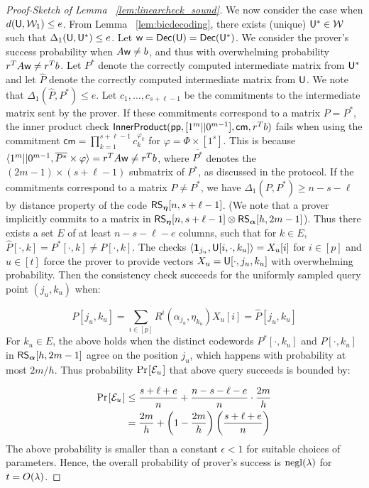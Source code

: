 \begin{proof}[Proof-Sketch of Lemma ~\ref{lem:linearcheck_sound}]
We now consider the case when $d(\mathsf{U},\mathcal{W}_1)\leq e$. From Lemma
~\ref{lem:bicdecoding}, there exists (unique) $\mathsf{U}^*\in \mathcal{W}$
such that $\Delta_1(\mathsf{U},\mathsf{U}^*)\leq e$.
Let $\mathsf{w}=\mathsf{Dec}(\mathsf{U})=\mathsf{Dec}(\mathsf{U}^*)$. We consider the prover's success
probability when $A\mathsf{w}\neq b$, and thus with overwhelming probability $r^TA \mathsf{w} \neq
r^Tb$. Let $P^*$ denote the correctly computed intermediate matrix from $\mathsf{U}^*$ and let
$\hat{P}$ denote the correctly computed intermediate matrix from $\mathsf{U}$. We note that
$\Delta_1(\hat{P},P^*)\leq e$. Let $c_1,\ldots,c_{s+\ell-1}$ be the commitments
to the intermediate matrix sent by the prover. If these commitments correspond to a
matrix $P=P^*$, the inner product check
$\mathsf{InnerProduct}(\mathsf{pp},[1^m||0^{m-1}],\mathsf{cm},r^Tb)$ fails when using the
commitment $\mathsf{cm}=\prod_{k=1}^{s+\ell-1}c_k^{\varphi_k}$ for
$\varphi=\Phi\times [1^s]$. This is because $\langle 1^m||0^{m-1},\overline{P^*}\times
\varphi\rangle=r^TA\mathsf{w}\neq r^Tb$, where $\overline{P^*}$ denotes the
$(2m-1)\times (s+\ell-1)$ submatrix of $P^*$,
as discussed in the protocol. If the
commitments correspond  to a matrix $P\neq P^*$, we have
$\Delta_1(P,P^*)\geq n-s-\ell$ by distance property of the code
$\mathsf{RS}_{\bm{\eta}}[n, s+\ell-1]$. 
(We note that a prover implicitly commits to a matrix in
$\mathsf{RS}_{\bm{\eta}}[n,s+\ell-1]\otimes \mathsf{RS}_{\bm{\alpha}}[h,2m-1]$).
Thus there exists a set $E$ of at least $n-s-\ell-e$ columns, such that for
$k\in E$, $\hat{P}[\cdot,k]=P^*[\cdot,k]\neq P[\cdot,k]$. The checks
$\langle \bm{1}_{j_u},\mathsf{U}[i,\cdot,k_u]\rangle=X_u[i]$ for $i\in [p]$ and $u\in [t]$ 
force the prover to provide vectors $X_u=\mathsf{U}[\cdot,j_u,k_u]$ with
overwhelming probability. Then the consistency check succeeds for the 
uniformly sampled query point $(j_u,k_u)$ when:

{\footnotesize
\[ P[j_u,k_u] = \sum_{i\in [p]}R^i(\alpha_{j_u},\eta_{k_u})X_u[i] =
\hat{P}[j_u,k_u] \]}
For $k_u\in E$, the above holds when the distinct codewords $P^*[\cdot,k_u]$ and
$P[\cdot,k_u]$ in $\mathsf{RS}_{\bm{\alpha}}[h,2m-1]$ agree on the position $j_u$, which happens with 
probability at most $2m/h$. Thus probability $\prob{\mc{E}_u}$ that above query succeeds is bounded by:

{\footnotesize
\begin{align*}
\prob{\mc{E}_u}&\leq \frac{s+\ell+e}{n} + \frac{n-s-\ell-e}{n}\cdot\frac{2m}{h}
\\
&= \frac{2m}{h}+\left(1-\frac{2m}{h}\right)\left(\frac{s+\ell+e}{n}\right)
\end{align*}
}
The above probability is smaller than a constant $\epsilon<1$ for suitable
choices of parameters. Hence, the overall probability of prover's success is
$\mathrm{negl}(\lambda)$ for $t=O(\lambda)$.
\end{proof}

